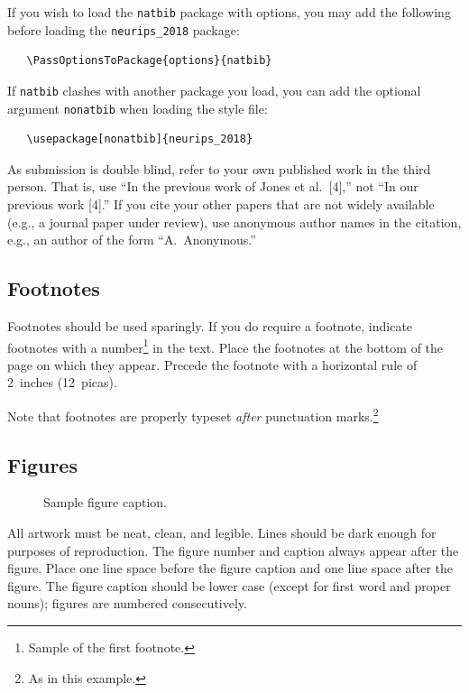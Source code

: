 \documentclass{article}
\begin{document}
If you wish to load the \verb+natbib+ package with options, you may add the
following before loading the \verb+neurips_2018+ package:
\begin{verbatim}
   \PassOptionsToPackage{options}{natbib}
\end{verbatim}

If \verb+natbib+ clashes with another package you load, you can add the optional
argument \verb+nonatbib+ when loading the style file:
\begin{verbatim}
   \usepackage[nonatbib]{neurips_2018}
\end{verbatim}

As submission is double blind, refer to your own published work in the third
person. That is, use ``In the previous work of Jones et al.\ [4],'' not ``In our
previous work [4].'' If you cite your other papers that are not widely available
(e.g., a journal paper under review), use anonymous author names in the
citation, e.g., an author of the form ``A.\ Anonymous.''

\subsection{Footnotes}

Footnotes should be used sparingly.  If you do require a footnote, indicate
footnotes with a number\footnote{Sample of the first footnote.} in the
text. Place the footnotes at the bottom of the page on which they appear.
Precede the footnote with a horizontal rule of 2~inches (12~picas).

Note that footnotes are properly typeset \emph{after} punctuation
marks.\footnote{As in this example.}

\subsection{Figures}

\begin{figure}
  \centering
  \fbox{\rule[-.5cm]{0cm}{4cm} \rule[-.5cm]{4cm}{0cm}}
  \caption{Sample figure caption.}
\end{figure}

All artwork must be neat, clean, and legible. Lines should be dark enough for
purposes of reproduction. The figure number and caption always appear after the
figure. Place one line space before the figure caption and one line space after
the figure. The figure caption should be lower case (except for first word and
proper nouns); figures are numbered consecutively.
\end{document}

